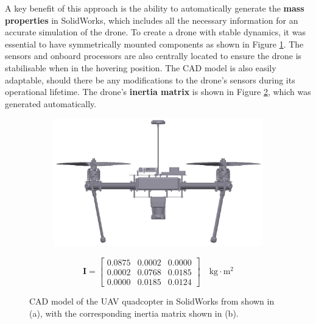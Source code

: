 A key benefit of this approach is the ability to automatically generate the \textbf{mass properties} in SolidWorks, which includes all the necessary information for an accurate simulation of the drone. To create a drone with stable dynamics, it was essential to have symmetrically mounted components as shown in Figure \ref{fig:2a}. The sensors and onboard processors are also centrally located to ensure the drone is stabilisable when in the hovering position. The CAD model is also easily adaptable, should there be any modifications to the drone's sensors during its operational lifetime. The drone's \textbf{inertia matrix} is shown in Figure \ref{fig:2b}, which was generated automatically.

\begin{figure}[H]
    \centering
    \begin{subfigure}[b]{0.5\textwidth} %
        \centering
        \includegraphics[width=\textwidth]{figs/Samuel/Figures/drone_new2 (cropped) (pdfresizer.com).pdf}
        \caption{}
        \label{fig:2a}
    \end{subfigure}
    \hspace{0.01\textwidth}
    \begin{subfigure}[b]{0.3\textwidth} %
        \centering
        \begin{equation*}
            \mathbf{I} =
            \begin{bmatrix}
                0.0875& 0.0002 & 0.0000 \\
                0.0002 & 0.0768 & 0.0185 \\
               0.0000 & 0.0185 & 0.0124
            \end{bmatrix} \quad \text{kg} \cdot \text{m}^2
        \end{equation*}
        \caption{}
        \label{fig:2b}
    \end{subfigure}
    \caption{CAD model of the UAV quadcopter in SolidWorks from \cite{westin2019x4} shown in (a), with the corresponding inertia matrix shown in (b).}
    \label{fig:dronecad}
\end{figure}


